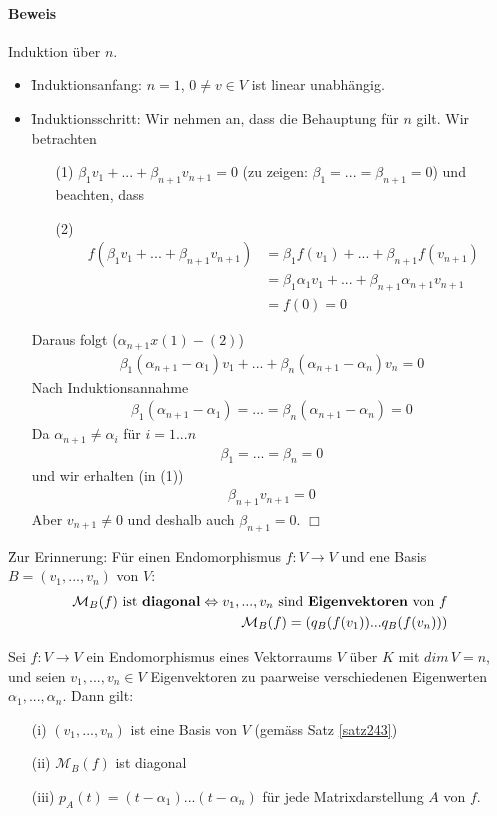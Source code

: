 \paragraph{Beweis}
Induktion über $n$.
\begin{itemize}
\item \f{Induktionsanfang:} $n=1$, $0 \neq v \in V$ ist linear unabhängig.
\item \f{Induktionsschritt:} Wir nehmen an, dass die Behauptung für $n$ gilt. Wir betrachten
\begin{itemize}
\item[(1)] $ \beta_1 v_1 + ... + \beta_{n+1} v_{n+1} = 0$ (zu zeigen: $\beta_1 = ... = \beta_{n+1} = 0$) und beachten, dass
\item[(2)]
\begin{align}
f(\beta_1 v_1 + ... + \beta_{n+1} v_{n+1}) &= \beta_1 f(v_1) + ... + \beta_{n+1} f(v_{n+1}) \\
&= \beta_1 \alpha_1 v_1 + ... + \beta_{n+1} \alpha_{n+1} v_{n+1} \\
&= f(0) = 0
\end{align}
\end{itemize}
Daraus folgt ($\alpha_{n+1} x (1) - (2)$)
\begin{align}
\beta_1(\alpha_{n+1}-\alpha_1) v_1 + ... + \beta_n(\alpha_{n+1}-\alpha_n) v_n = 0
\end{align}
Nach Induktionsannahme
\begin{align}
\beta_1(\alpha_{n+1} - \alpha_1) = ... = \beta_n(\alpha_{n+1} - \alpha_n) = 0
\end{align}
Da $\alpha_{n+1} \neq \alpha_i$ für $i=1...n$
\begin{align}
\beta_1 = ... = \beta_n = 0
\end{align}
und wir erhalten (in (1))
\begin{align}
\beta_{n+1} v_{n+1} = 0
\end{align}
Aber $v_{n+1} \neq 0$ und deshalb auch $\beta_{n+1} = 0$. \hfill $\Box$
\end{itemize}
\f{Zur Erinnerung}: Für einen Endomorphismus $f: V \rightarrow V$ und ene Basis $B= (v_1, ..., v_n)$ von $V$:
\begin{align}
\mathcal{M}_B(f) \text{ ist \textbf{diagonal}} \Leftrightarrow v_1, ..., v_n \text{ sind \textbf{Eigenvektoren} von $f$} \\
\mathcal{M}_B(f) = (q_B(f(v_1))...q_B(f(v_n)))
\end{align}
\newpage
\begin{korollar} %
\label{korollar244}
Sei $f: V \rightarrow V$ ein Endomorphismus eines Vektorraums $V$ über $K$ mit $dim\, V=n$, und seien $v_1, ..., v_n \in V$ Eigenvektoren zu paarweise verschiedenen Eigenwerten $\alpha_1, ..., \alpha_n$.
Dann gilt:
\begin{itemize}
\item[(i)] $(v_1, ..., v_n)$ ist eine Basis von $V$ (gemäss Satz \ref{satz243})
\item[(ii)] $\mathcal{M}_B(f)$ ist diagonal
\item[(iii)] $p_A(t) = (t- \alpha_1)... (t - \alpha_n)$ für jede Matrixdarstellung $A$ von $f$.
\end{itemize}
\end{korollar}

